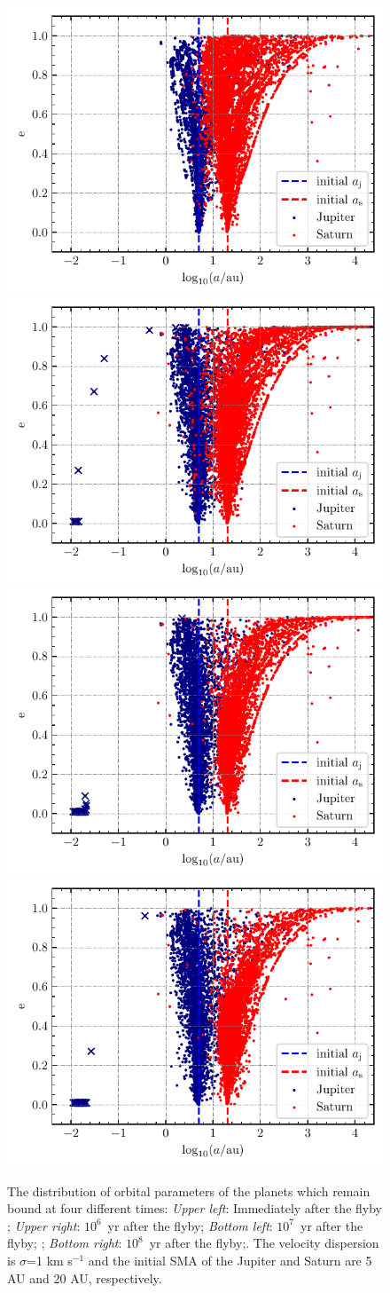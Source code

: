 \documentclass[twocolumn]{aastex63}
\begin{document}
\begin{figure}
    \includegraphics[width=.45\textwidth]{figs/ae-flyby_inone-r4.pdf}
    \includegraphics[width=.45\textwidth]{figs/ae-1e6_inone-r4.pdf}\\
    \includegraphics[width=.45\textwidth]{figs/ae-1e7_inone-r4.pdf}
    \includegraphics[width=.45\textwidth]{figs/ae-1e8_inone-r4.pdf}
    \caption{The distribution of orbital parameters of the planets which remain bound at four different times:
    \textit{Upper left}: Immediately after the flyby ; \textit{Upper right}: $10^6$~yr after the flyby; \textit{Bottom left}: $10^7$~yr after the flyby; ; \textit{Bottom right}: $10^8$~yr after the flyby;. The velocity dispersion is $\sigma$=1 km s$^{-1}$ and the initial SMA of the Jupiter and Saturn are 5 AU and 20 AU, respectively.}
    \label{Fig:a-etot-r4}
\end{figure}
\end{document}
